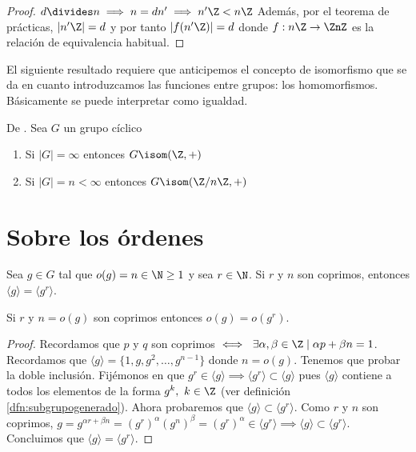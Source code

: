 \begin{proof}
	$d \divides n \implies n = dn' \implies n'\Z < n\Z$ Además, por el teorema de prácticas, $|n'\Z| = d$ y por tanto $|f(n'\Z)| = d$ donde $f:n\Z \to \ZnZ$ es la relación de equivalencia habitual.
\end{proof}

El siguiente resultado requiere que anticipemos el concepto de isomorfismo que se da en cuanto introduzcamos las funciones entre grupos: los homomorfismos. Básicamente se puede interpretar como igualdad.

\begin{thm} De \cite{dor96}.
	\label{thm:clasificacionciclicos}
	Sea $G$ un grupo cíclico
	\begin{enumerate}
		\item Si $|G| = \infty$ entonces $G \isom (\Z, +)$
		\item Si $|G| = n < \infty$ entonces $G \isom (\Z/n\Z, +)$
	\end{enumerate}
\end{thm}

\section{Sobre los órdenes}

\begin{thm}
	\label{thm:coprimosgeneradosiguales}
	Sea $g \in G$ tal que $o(g) = n \in \N \geq 1$ y sea $r \in \N$. Si $r$ y $n$ son coprimos, entonces $\langle g \rangle = \langle g^r \rangle$.
\end{thm}

\begin{cor}
	Si $r$ y $n = o(g)$ son coprimos entonces $o(g) = o(g^r)$.
\end{cor}

\begin{proof}
	Recordamos que $p$ y $q$ son coprimos $\iff\ \exists \alpha, \beta \in \Z \mid \alpha p + \beta n = 1$. Recordamos que $\langle g \rangle = \{1, g, g^2, \dots, g^{n-1}\}$ donde $n = o(g)$. Tenemos que probar la doble inclusión. Fijémonos en que $g^r \in \langle g \rangle \implies \langle g^r\rangle \subset \langle g \rangle$ pues $\langle g \rangle$ contiene a todos los elementos de la forma $g^k,\ k \in \Z$ (ver definición \ref{dfn:subgrupogenerado}). Ahora probaremos que $\langle g \rangle \subset \langle g^r \rangle$. Como $r$ y $n$ son coprimos, $g = g^{\alpha r + \beta n} = (g^r)^\alpha (g^n)^\beta = (g^r)^\alpha \in \langle g^r \rangle \implies \langle g \rangle \subset \langle g^r \rangle$. Concluimos que $\langle g \rangle = \langle g^r \rangle$.
\end{proof}

